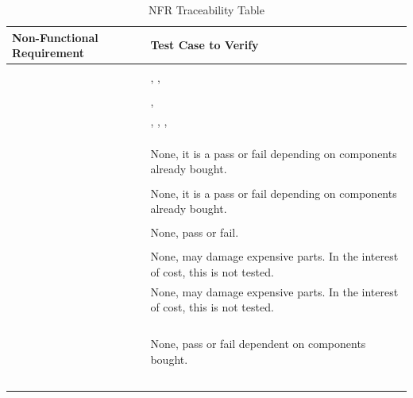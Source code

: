 \documentclass[12pt, titlepage]{article}
\begin{document}
\begin{table}[!h]
\begin{center}
\caption {NFR Traceability Table}
\label{tab:traceTCR_NFR}
\begin{tabular}{ | m{3cm} | m{12cm} | } 
\hline
Non-Functional Requirement & Test Case to Verify \\
\hline
\nameref{PERF_001} & \nameref{tab:STCR_013} \\ \hline
\nameref{PERF_002} & \nameref{tab:STCR_001}, \nameref{tab:STCR_002}, \nameref{tab:STCR_003} \\ \hline
\nameref{PERF_003} & \nameref{tab:STCR_004} \\ \hline
\nameref{PERF_004} &  \nameref{tab:STCR_013}, \nameref{tab:UTCR_007} \\ \hline
\nameref{PERF_005} & \nameref{tab:STCR_002}, \nameref{tab:STCR_003}, \nameref{tab:UTCR_005}, \nameref{tab:UTCR_006} \\ \hline
\nameref{PERF_006} & \nameref{tab:STCR_004} \\ \hline
\nameref{PERF_007} & \nameref{tab:STCR_015} \\ \hline
\nameref{PERF_008} & \nameref{tab:STCR_004} \\ \hline
\nameref{DES_001} & None, it is a pass or fail depending on components already bought. \\ \hline
\nameref{STD_001} & \nameref{tab:STCR_019} \\ \hline
\nameref{STD_002} & None, it is a pass or fail depending on components already bought. \\ \hline
\nameref{SEC_001} & \nameref{tab:UTCR_009} \\ \hline
\nameref{SEC_002} & None, pass or fail. \\ \hline
\nameref{MTNC_001} & \nameref{tab:STCR_020} \\ \hline
\nameref{MTNC_002} & None, may damage expensive parts. In the interest of cost, this is not tested. \\ \hline
\nameref{MTNC_003} & None, may damage expensive parts. In the interest of cost, this is not tested. \\ \hline
\nameref{SAFE_001} & \nameref{tab:STCR_021} \\ \hline
\nameref{SAFE_002} & \nameref{tab:STCR_002} \\ \hline
\nameref{SAFE_003} & \nameref{tab:STCR_018} \\ \hline
\nameref{SAFE_004} & \nameref{tab:STCR_021} \\ \hline
\nameref{SAFE_005} & None, pass or fail dependent on components bought. \\ \hline
\nameref{USE_001} & \nameref{tab:STCR_004} \\ \hline
\nameref{USE_002} & \nameref{tab:STCR_022} \\ \hline
\nameref{USE_003} & \nameref{tab:STCR_006} \\ \hline
\nameref{USE_004} & \nameref{tab:STCR_017} \\ \hline
\nameref{USE_005} & \nameref{tab:UTCR_008} \\ \hline
\end{tabular}
\end{center}
\end{table}
\end{document}
